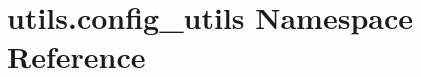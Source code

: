 \hypertarget{namespaceutils_1_1config__utils}{}\section{utils.\+config\+\_\+utils Namespace Reference}
\label{namespaceutils_1_1config__utils}
